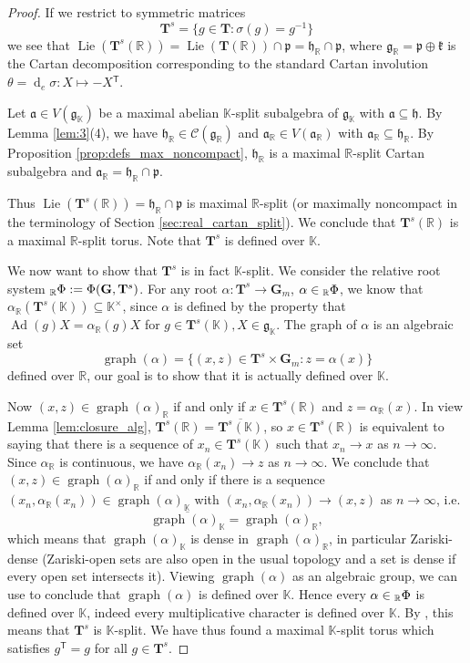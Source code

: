 \documentclass[12pt]{amsart}
\newcommand{\R}{\mathbb{R} }
\newcommand{\K}{\mathbb{K}}
\newcommand{\frakg}{\mathfrak{g}}
\newcommand{\frakp}{\mathfrak{p}}
\newcommand{\frakk}{\mathfrak{k}}
\newcommand{\fraka}{\mathfrak{a}}
\newcommand{\frakh}{\mathfrak{h}}
\newcommand{\bG}{\mathbf{G}}
\newcommand{\bT}{\mathbf{T}}
\newcommand{\tran}{{^{\mathsf{T}}\!}}
\newcommand{\RPhi}{\vphantom{\Phi}_{\R}\Phi}
\numberwithin{equation}{section}
\theoremstyle{remark} %
\begin{document}
\begin{proof}
	If we restrict to symmetric matrices
	$$
	\bT^s = \{ g \in \bT \colon \sigma (g) = g^{-1} \}
	$$
	we see that $\operatorname{Lie}(\bT^s(\R)) = \operatorname{Lie}(\bT(\R)) \cap \frakp = \frakh_\R \cap \frakp$, where $\frakg_\R = \frakp \oplus \frakk$ is the Cartan decomposition corresponding to the standard Cartan involution $\theta = \operatorname{d}_e\sigma \colon X \mapsto -X\tran$. 
	
	Let $\fraka \in V(\frakg_\K)$ be a maximal abelian $\K$-split subalgebra of $\frakg_\K$ with $\fraka \subseteq \frakh$. By Lemma \ref{lem:3}(4), we have $\frakh_\R \in \mathcal{C}(\frakg_\R)$ and $\fraka_\R \in V(\fraka_\R)$ with $\fraka_\R \subseteq \frakh_\R$. By Proposition \ref{prop:defs_max_noncompact}, $\frakh_\R$ is a maximal $\R$-split Cartan subalgebra and $\fraka_\R = \frakh_\R \cap \frakp$.
	
	
	Thus $\operatorname{Lie}(\bT^s(\R)) = \frakh_\R\cap \frakp$ is maximal $\R$-split (or maximally noncompact in the terminology of Section \ref{sec:real_cartan_split}). We conclude that $\bT^s(\R)$ is a maximal $\R$-split torus. 	
	Note that $\bT^s$ is defined over $\K$.

	We now want to show that $\bT^s$ is in fact $\K$-split. 
	We consider the relative root system $\RPhi := \Phi(\bG,\bT^s) $. %
	For any root $\alpha \colon \bT^s \to \bG_m $, $\alpha \in ~\!\! \RPhi$, we know that $\alpha_\R(\bT^s(\K)) \subseteq \K^\times$, since $\alpha$ is defined by the property that $\operatorname{Ad}(g)X =\alpha_\R(g)X$ for $g \in \bT^s(\K), X \in \frakg_\K$. 
	The graph of $\alpha$ is an algebraic set
	$$
	\operatorname{graph}(\alpha) = \{ (x,z) \in  \bT^s \times \bG_m \colon z = \alpha(x) \}  
	$$
	defined over $\R$, our goal is to show that it is actually defined over $\K$. 
	
	Now $(x,z) \in \operatorname{graph}(\alpha)_\R$ if and only if $x \in \bT^s(\R)$ and $z = \alpha_\R(x)$. In view Lemma \ref{lem:closure_alg}, $\bT^s(\R) = \overline{\bT^s(\K)}$, so $x \in \bT^s(\R)$ is equivalent to saying that there is a sequence of $x_n \in \bT^s(\K)$ such that $x_n \to x$ as $n \to \infty$. Since $\alpha_\R$ is continuous,
	we have $\alpha_\R(x_n) \to z$ as $n \to \infty$. We conclude that $(x,z) \in \operatorname{graph}(\alpha)_\R$ if and only if there is a sequence $(x_n, \alpha_\R(x_n)) \in \operatorname{graph}(\alpha)_\K$ with $(x_n, \alpha_\R(x_n)) \to (x,z)$ as $n \to \infty$, i.e. 
	$$
	\overline{\operatorname{graph}(\alpha)_\K} = \operatorname{graph}(\alpha)_\R,
	$$ 
	which means that $\operatorname{graph}(\alpha)_\K$ is dense in $\operatorname{graph}(\alpha)_\R$, in particular Zariski-dense (Zariski-open sets are also open in the usual topology and a set is dense if every open set intersects it). Viewing $\operatorname{graph}(\alpha)$ as an algebraic group, we can use \cite[Proposition 3.1.8]{Zim} to conclude that $\operatorname{graph}(\alpha)$ is defined over $\K$. Hence every $\alpha \in \RPhi$ is defined over $\K$, indeed every multiplicative character is defined over $\K$. By \cite[Corollary 8.2]{Bor}, this means that $\bT^s$ is $\K$-split. We have thus found a maximal $\K$-split torus which satisfies $g\tran = g $ for all $g \in \bT^s$.
	

\end{proof}
\end{document}
